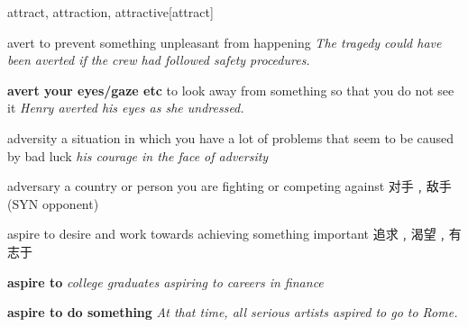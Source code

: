\begin{word}{attract, attraction, attractive}[attract]
\end{word}

\begin{word}{avert}
    to prevent something unpleasant from happening
    \textit{The tragedy could have been averted if the crew had followed safety procedures.}

    \textbf{avert your eyes/gaze etc} 
    to look away from something so that you do not see it
    \textit{Henry averted his eyes as she undressed.}

\end{word}

\begin{word}{adversity}
    a situation in which you have a lot of problems that seem to be caused by bad luck
    \textit{his courage in the face of adversity}
\end{word}

\begin{word}{adversary}
    a country or person you are fighting or competing against 对手﹐敌手 (SYN opponent)
\end{word}

\begin{word}{aspire}
    to desire and work towards achieving something important
    追求﹐渴望﹐有志于

    \textbf{aspire to}
    \textit{college graduates aspiring to careers in finance}

    \textbf{aspire to do something}
    \textit{At that time, all serious artists aspired to go to Rome.}
\end{word}